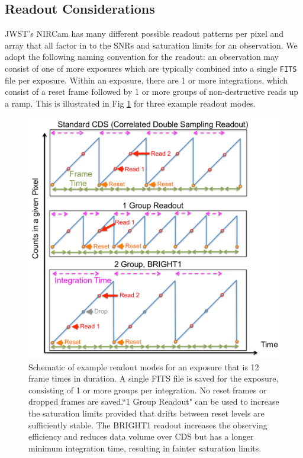 \documentclass[iop]{emulateapj}
\begin{document}
\subsection{Readout Considerations}\label{sec:readout}
JWST's NIRCam has many different possible readout patterns per pixel and array that all factor in to the SNRs and saturation limits for an observation.
We adopt the following naming convention for the readout: an observation may consist of one of more exposures which are typically combined into a single \texttt{FITS} file per exposure.
Within an exposure, there are 1 or more integrations, which consist of a reset frame followed by 1 or more groups of non-destructive reads up a ramp.
This is illustrated in Fig \ref{fig:readout} for three example readout modes.

\begin{figure}[t]
\centering
\includegraphics[width=1.0\columnwidth]{readout_schematic.pdf}
\caption{Schematic of example readout modes for an exposure that is 12 frame times in duration.
A single FITS file is saved for the exposure, consisting of 1 or more groups per integration.
No reset frames or dropped frames are saved.``1 Group Readout" can be used to increase the saturation limits provided that drifts between reset levels are sufficiently stable.
The BRIGHT1 readout increases the observing efficiency and reduces data volume over CDS but has a longer minimum integration time, resulting in fainter saturation limits.}\label{fig:readout}
\end{figure}
\end{document}
